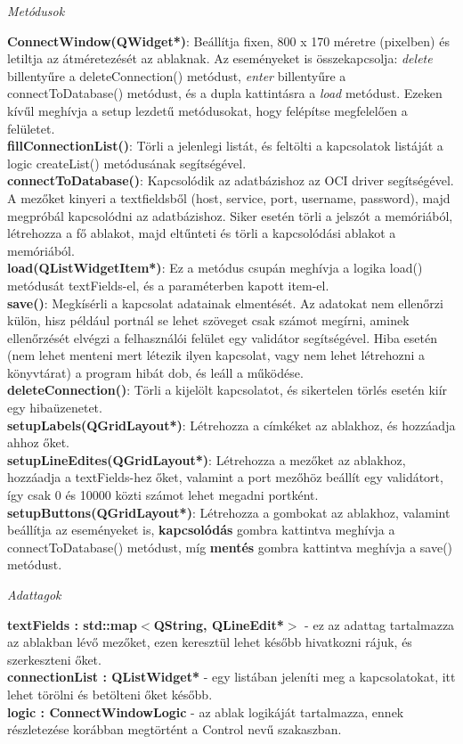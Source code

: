 \begin{flushleft}
\textit{Metódusok}
\end{flushleft}
\textbf{ConnectWindow(QWidget*)}: Beállítja fixen, 800 x 170 méretre (pixelben) és letiltja az átméretezését az ablaknak. Az eseményeket is összekapcsolja: \textit{delete} billentyűre a deleteConnection() metódust, \textit{enter} billentyűre a connectToDatabase() metódust, és a dupla kattintásra a \textit{load} metódust. Ezeken kívűl meghívja a setup lezdetű metódusokat, hogy felépítse megfelelően a felületet. \\
\textbf{fillConnectionList()}: Törli a jelenlegi listát, és feltölti a kapcsolatok listáját a logic createList() metódusának segítségével. \\
\textbf{connectToDatabase()}: Kapcsolódik az adatbázishoz az OCI driver segítségével. A mezőket kinyeri a textfieldsből (host, service, port, username, password), majd megpróbál kapcsolódni az adatbázishoz. Siker esetén törli a jelszót a memóriából, létrehozza a fő ablakot, majd eltűnteti és törli a kapcsolódási ablakot a memóriából. \\
\textbf{load(QListWidgetItem*)}: Ez a metódus csupán meghívja a logika load() metódusát textFields-el, és a paraméterben kapott item-el. \\
\textbf{save()}: Megkísérli a kapcsolat adatainak elmentését. Az adatokat nem ellenőrzi külön, hisz például portnál se lehet szöveget csak számot megírni, aminek ellenőrzését elvégzi a felhasználói felület egy validátor segítségével. Hiba esetén (nem lehet menteni mert létezik ilyen kapcsolat, vagy nem lehet létrehozni a könyvtárat) a program hibát dob, és leáll a működése. \\
\textbf{deleteConnection()}: Törli a kijelölt kapcsolatot, és sikertelen törlés esetén kiír egy hibaüzenetet. \\
\textbf{setupLabels(QGridLayout*)}: Létrehozza a címkéket az ablakhoz, és hozzáadja ahhoz őket. \\
\textbf{setupLineEdites(QGridLayout*)}: Létrehozza a mezőket az ablakhoz, hozzáadja a textFields-hez őket, valamint a port mezőhöz beállít egy validátort, így csak 0 és 10000 közti számot lehet megadni portként. \\
\textbf{setupButtons(QGridLayout*)}: Létrehozza a gombokat az ablakhoz, valamint beállítja az eseményeket is, \textbf{kapcsolódás} gombra kattintva meghívja a connectToDatabase() metódust, míg \textbf{mentés} gombra kattintva meghívja a save() metódust.

\begin{flushleft}
\textit{Adattagok}
\end{flushleft}
\textbf{textFields : std::map$<$QString, QLineEdit*$>$} - ez az adattag tartalmazza az ablakban lévő mezőket, ezen keresztül lehet később hivatkozni rájuk, és szerkeszteni őket. \\
\textbf{connectionList : QListWidget*} - egy listában jeleníti meg a kapcsolatokat, itt lehet törölni és betölteni őket később. \\
\textbf{logic : ConnectWindowLogic} - az ablak logikáját tartalmazza, ennek részletezése korábban megtörtént a Control nevű szakaszban.

